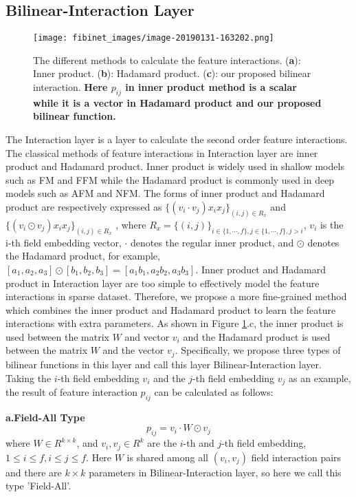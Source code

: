 \documentclass[sigconf]{acmart}
\begin{document}
\subsection{Bilinear-Interaction Layer}

\begin{figure}
\centering
\texttt{[image: fibinet\_images/image-20190131-163202.png]}
\caption{The different methods to calculate the feature
interactions. (\textbf{a}): Inner product. (\textbf{b}): Hadamard
product. (\textbf{c}): our proposed bilinear interaction. \textbf{Here
\(p_{ij}\) in inner product method is a scalar while it is a vector in
Hadamard product and our proposed bilinear function.}}
\label{fig:f3}
\end{figure}

The Interaction layer is a layer to calculate the second order feature
interactions. The classical methods of feature interactions in Interaction layer are inner product and Hadamard product. Inner product is widely used in shallow models such as FM and FFM while the Hadamard
product is commonly used in deep models such as AFM and NFM. The forms of inner product and Hadamard product are respectively expressed as \(\{(v_i \cdot  v_j)x_ix_j\}_{(i,j)\in R_x}\)
and \(\{(v_i \odot v_j)x_ix_j\}_{(i,j)\in R_x}\) , where \(R_x=\{(i,j)\}_{i \in \{1,\cdots,f\}, j\in \{1,\cdots,f\}, j >i} \), \(v_i\) is the i-th field embedding vector, \(\cdot\) denotes the regular inner product, and \(\odot\) denotes the Hadamard product, for example, \([a_1, a_2, a_3] \odot [b_1, b_2, b_3] = [a_1b_1, a_2b_2, a_3b_3]\). Inner product and Hadamard product in Interaction layer are too simple to effectively model the feature interactions in sparse dataset. Therefore, we propose a more fine-grained method which combines the inner product and Hadamard product
to learn the feature interactions with extra parameters. As shown in Figure \ref{fig:f3}.c, the inner product is used between the matrix \(W\) and
vector \(v_i\) and the Hadamard product is used between the matrix
\(W\) and the vector \(v_j\). Specifically, we propose three
types of bilinear functions in this layer and call this
layer Bilinear-Interaction layer. Taking the \(i\)-th field embedding
\(v_i\) and the \(j\)-th field embedding \(v_j\) as an example, the
result of feature interaction \(p_{ij}\) can be calculated as follows:

\noindent\textbf{a.Field-All Type}
\begin{equation}
p_{ij}=v_i\cdot W\odot v_j
\end{equation}
where \(W \in R^{k \times k}\), and \(v_i, v_j \in R^k\) are the
\(i\)-th and \(j\)-th field embedding,
\(1 \le i \le f,  i \le j \le f\). Here \(W\) is shared among all
\((v_i, v_j)\) field interaction pairs and there are \(k \times k\)
parameters in Bilinear-Interaction layer, so here we call this type
'Field-All'.
\end{document}
